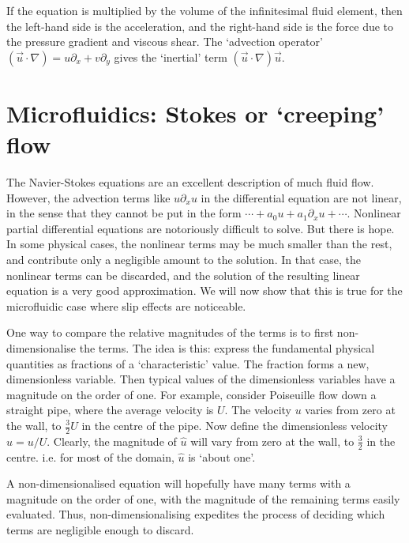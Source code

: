 \documentclass[12pt, a4paper, twoside, openright]{book}
\begin{document}
If the equation is multiplied by the volume of the infinitesimal fluid element, then
the left-hand side is the acceleration, and the right-hand side is the force due to the pressure gradient and viscous shear.  The `advection operator'
 $(\vec{u} \cdot \nabla ) = u \partial_x + v \partial_y $
 gives the `inertial' term  $ (\vec{u}\cdot \nabla)\vec{u} $.


\clearpage
\section{Microfluidics: Stokes or `creeping' flow}


The Navier-Stokes equations are an excellent description of much fluid flow.  However, the advection terms like $u \partial_x u$ in the differential equation are not linear, in the sense
that they cannot be put in the form $\dotsb + a_0 u + a_1 \partial_x u + \dotsb$.  Nonlinear partial differential equations are notoriously difficult to solve.  But there is hope.  In some physical cases, the nonlinear terms may be much smaller than the rest, and contribute only a negligible amount to the solution.  In that case, the nonlinear terms can be discarded, and the solution of the resulting linear equation is a very good approximation.  We will now show that this is true for the microfluidic case where slip effects are noticeable.

One way to compare the relative magnitudes of the terms is to first non-dimensionalise the terms. The idea is this: express the fundamental physical quantities as fractions of a `characteristic' value. The fraction forms a new, dimensionless variable. Then typical values of the dimensionless variables have a magnitude on the order of one.  For example, consider Poiseuille flow down a straight pipe, where the average velocity is $U$.  The velocity $u$ varies from zero at the wall, to  $\frac{3}{2} U$ in the centre of the pipe.  Now define the dimensionless velocity $\hat{u} = u/U$.  Clearly, the magnitude of $\hat{u}$ will vary from zero at the wall, to $\frac{3}{2}$ in the centre. i.e. for most of the domain, $\hat{u}$ is `about one'.

A non-dimensionalised equation will hopefully have many terms with a magnitude on the order of one, with the magnitude of the remaining terms easily evaluated.  Thus, non-dimensionalising expedites the process of deciding which terms are negligible enough to discard.


\end{document}
